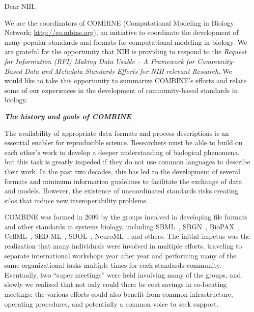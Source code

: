 

\newcommand{\eg}{e.g.,\xspace}
\newcommand{\idorg}{\href{http://identifiers.org}{\texttt{Identifiers.org}}\xspace}


Dear NIH,

We are the coordinators of COMBINE (Computational Modeling in Biology Network; \url{http://co.mbine.org}), an initiative to coordinate the development of many popular standards and formats for computational modeling in biology.  We are grateful for the opportunity that NIH is providing to respond to the \emph{Request for Information (RFI) Making Data Usable -- A Framework for Community-Based Data and Metadata Standards Efforts for NIH-relevant Research}.  We would like to take this opportunity to summarize COMBINE's efforts and relate some of our experiences in the development of community-based standards in biology.


\textbf{\textsl{The history and goals of COMBINE}}

The availability of appropriate data formats and process descriptions is an essential enabler for reproducible science.  Researchers must be able to build on each other's work to develop a deeper understanding of biological phenomena, but this task is greatly impeded if they do not use common languages to describe their work. In the past two decades, this has led to the development of several formats and minimum information guidelines to facilitate the exchange of data and models. However, the existence of uncoordinated standards risks creating silos that induce new interoperability problems.

COMBINE was formed in 2009 by the groups involved in developing file formats and other standards in systems biology, including SBML~\cite{hucka_2003, hucka_2010}, SBGN~\cite{le2009systems}, BioPAX~\cite{demir2010}, CellML~\cite{cuellar2003overview, hedley_2001b}, SED-ML~\cite{sedml2011}, SBOL~\cite{galdzicki2014}, NeuroML~\cite{gleeson_2010}, and others.  The initial impetus was the realization that many individuals were involved in multiple efforts, traveling to separate international workshops year after year and performing many of the same organizational tasks multiple times for each standards community.  Eventually, two ``super meetings'' were held involving many of the groups, and slowly we realized that not only could there be cost savings in co-locating meetings: the various efforts could also benefit from common infrastructure, operating procedures, and potentially a common voice to seek support.

